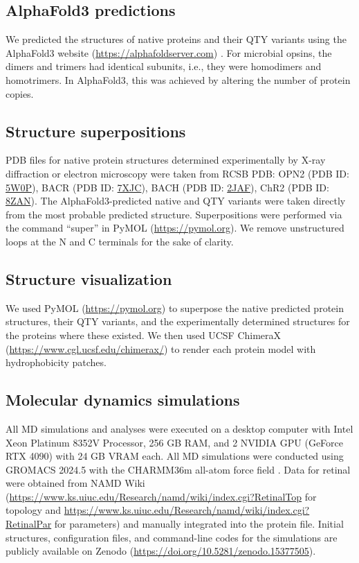 \documentclass[fleqn, 10pt, lineno]{manuscript}
\begin{document}
\subsection*{AlphaFold3 predictions}

We predicted the structures of native proteins and their QTY variants using the AlphaFold3 website (\url{https://alphafoldserver.com}) \citep{Abramson_2024}. For microbial opsins, the dimers and trimers had identical subunits, i.e., they were homodimers and homotrimers. In AlphaFold3, this was achieved by altering the number of protein copies. 

\subsection*{Structure superpositions}

PDB files for native protein structures determined experimentally by X-ray diffraction or electron microscopy were taken from RCSB PDB: OPN2 (PDB ID: \href{https://www.rcsb.org/structure/5W0P}{5W0P}), BACR (PDB ID: \href{https://www.rcsb.org/structure/7XJC}{7XJC}), BACH (PDB ID: \href{https://www.rcsb.org/structure/2JAF}{2JAF}), ChR2 (PDB ID: \href{https://www.rcsb.org/structure/8ZAN}{8ZAN}). The AlphaFold3-predicted native and QTY variants were taken directly from the most probable predicted structure. Superpositions were performed via the command ``super'' in PyMOL (\url{https://pymol.org}). We remove unstructured loops at the N and C terminals for the sake of clarity. 

\subsection*{Structure visualization}

We used PyMOL (\url{https://pymol.org}) to superpose the native predicted protein structures, their QTY variants, and the experimentally determined structures for the proteins where these existed. We then used UCSF ChimeraX (\url{https://www.cgl.ucsf.edu/chimerax/}) to render each protein model with hydrophobicity patches.  

\subsection*{Molecular dynamics simulations}

All MD simulations and analyses were executed on a desktop computer with Intel Xeon Platinum 8352V Processor, 256 GB RAM, and 2 NVIDIA GPU (GeForce RTX 4090) with 24 GB VRAM each. All MD simulations were conducted using GROMACS 2024.5 \citep{Abraham_2015} with the CHARMM36m all-atom force field \citep{Huang_2017}. Data for retinal were obtained from NAMD Wiki (\url{https://www.ks.uiuc.edu/Research/namd/wiki/index.cgi?RetinalTop} for topology and \url{https://www.ks.uiuc.edu/Research/namd/wiki/index.cgi?RetinalPar} for parameters) and manually integrated into the protein file. Initial structures, configuration files, and command-line codes for the simulations are publicly available on Zenodo (\url{https://doi.org/10.5281/zenodo.15377505}). 
\end{document}
